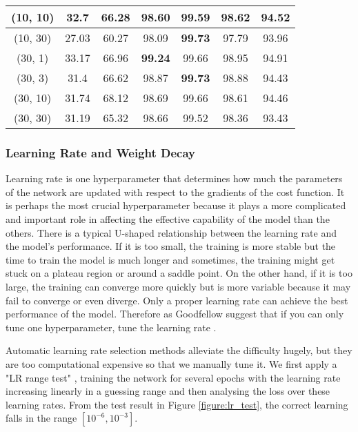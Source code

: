 \begin{table}[H]
{\begin{tabular}{|c|c|c|c|c|c|c|}
			(10, 10) & 32.7 & 66.28 & 98.60 & 99.59 & 98.62 & 94.52 \\ \hline
			(10, 30) & 27.03 & 60.27 & 98.09 & \textbf{99.73} & 97.79 & 93.96 \\ \hline
			(30, 1) & 33.17 & 66.96 & \textbf{99.24} & 99.66 & 98.95 & 94.91 \\ \hline
			(30, 3) & 31.4 & 66.62 & 98.87 & \textbf{99.73} & 98.88 & 94.43 \\ \hline
			(30, 10) & 31.74 & 68.12 & 98.69 & 99.66 & 98.61 & 94.46 \\ \hline
			(30, 30) & 31.19 & 65.32 & 98.66 & 99.52 & 98.36 & 93.43 \\ \hline
		\end{tabular}%
	}
\end{table}


\subsubsection{Learning Rate and Weight Decay}

Learning rate is one hyperparameter that determines how much the parameters of the network are updated with respect to the gradients of the cost function. It is perhaps the most crucial hyperparameter because it plays a more complicated and important role in affecting the effective capability of the model than the others. There is a typical U-shaped relationship between the learning rate and the model's performance. If it is too small, the training is more stable but the time to train the model is much longer and sometimes, the training might get stuck on a plateau region or around a saddle point. On the other hand, if it is too large, the training can converge more quickly but is more variable because it may fail to converge or even diverge. Only a proper learning rate can achieve the best performance of the model. Therefore as Goodfellow \etal suggest that if you can only tune one hyperparameter, tune the learning rate \cite{Goodfellow-et-al-2016}.

Automatic learning rate selection methods alleviate the difficulty hugely, but they are too computational expensive so that we manually tune it. We first apply a "LR range test" \cite{DBLP:journals/corr/Smith15a}, training the network for several epochs with the learning rate increasing linearly in a guessing range and then analysing the loss over these learning rates. From the test result in Figure \ref{figure:lr_test}, the correct learning falls in the range $[10^{-6}, 10^{-3}]$. 


